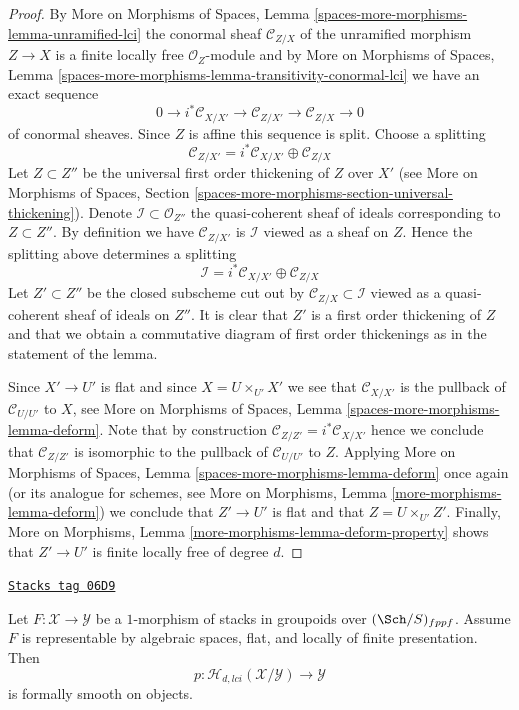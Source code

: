 \begin{proof}
By
More on Morphisms of Spaces,
Lemma \ref{spaces-more-morphisms-lemma-unramified-lci}
the conormal sheaf $\mathcal{C}_{Z/X}$ of the unramified morphism $Z \to X$
is a finite locally free $\mathcal{O}_Z$-module and by
More on Morphisms of Spaces,
Lemma \ref{spaces-more-morphisms-lemma-transitivity-conormal-lci}
we have an exact sequence
$$
0 \to i^*\mathcal{C}_{X/X'} \to
\mathcal{C}_{Z/X'} \to
\mathcal{C}_{Z/X} \to 0
$$
of conormal sheaves. Since $Z$ is affine this sequence is split. Choose
a splitting
$$
\mathcal{C}_{Z/X'} = i^*\mathcal{C}_{X/X'} \oplus \mathcal{C}_{Z/X}
$$
Let $Z \subset Z''$ be the universal first order thickening of $Z$
over $X'$ (see
More on Morphisms of Spaces,
Section \ref{spaces-more-morphisms-section-universal-thickening}).
Denote $\mathcal{I} \subset \mathcal{O}_{Z''}$ the quasi-coherent sheaf
of ideals corresponding to $Z \subset Z''$. By definition we have
$\mathcal{C}_{Z/X'}$ is $\mathcal{I}$ viewed as a sheaf on $Z$.
Hence the splitting above determines a splitting
$$
\mathcal{I} = i^*\mathcal{C}_{X/X'} \oplus \mathcal{C}_{Z/X}
$$
Let $Z' \subset Z''$ be the closed subscheme cut out by
$\mathcal{C}_{Z/X} \subset \mathcal{I}$ viewed as a quasi-coherent sheaf
of ideals on $Z''$. It is clear that $Z'$ is a first order thickening
of $Z$ and that we obtain a commutative diagram of first order thickenings
as in the statement of the lemma.

\medskip\noindent
Since $X' \to U'$ is flat and since $X = U \times_{U'} X'$ we see that
$\mathcal{C}_{X/X'}$ is the pullback of $\mathcal{C}_{U/U'}$ to $X$, see
More on Morphisms of Spaces, Lemma \ref{spaces-more-morphisms-lemma-deform}.
Note that by construction $\mathcal{C}_{Z/Z'} = i^*\mathcal{C}_{X/X'}$
hence we conclude that $\mathcal{C}_{Z/Z'}$ is isomorphic to the pullback
of $\mathcal{C}_{U/U'}$ to $Z$. Applying
More on Morphisms of Spaces, Lemma \ref{spaces-more-morphisms-lemma-deform}
once again (or its analogue for schemes, see
More on Morphisms, Lemma \ref{more-morphisms-lemma-deform})
we conclude that $Z' \to U'$ is flat and that $Z = U \times_{U'} Z'$.
Finally,
More on Morphisms, Lemma \ref{more-morphisms-lemma-deform-property}
shows that $Z' \to U'$ is finite locally free of degree $d$.
\end{proof}

\begin{lemma}
\label{criteria-lemma-lci-formally-smooth}
\href{https://stacks.math.columbia.edu/tag/06D9}{\texttt{Stacks tag 06D9}}

Let $F : \mathcal{X} \to \mathcal{Y}$ be a $1$-morphism of stacks in groupoids
over $(\Sch/S)_{fppf}$. Assume $F$ is representable by algebraic
spaces, flat, and locally of finite presentation. Then
$$
p : \mathcal{H}_{d, lci}(\mathcal{X}/\mathcal{Y}) \to \mathcal{Y}
$$
is formally smooth on objects.
\end{lemma}

